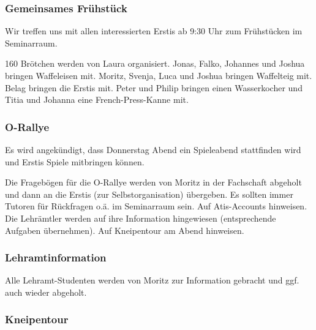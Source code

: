 \documentclass[10pt,twocolumn,ngerman]{scrartcl}
\begin{document}
\subsubsection{Gemeinsames Frühstück}

Wir treffen uns mit allen interessierten Erstis ab 9:30 Uhr zum Frühstücken
im Seminarraum.

160 Brötchen werden von Laura organisiert. Jonas, Falko, Johannes
und Joshua bringen Waffeleisen mit. Moritz, Svenja, Luca und Joshua
bringen Waffelteig mit. Belag bringen die Erstis mit. Peter und Philip
bringen einen Wasserkocher und Titia und Johanna eine French-Press-Kanne
mit.

\subsubsection{O-Rallye}

Es wird angekündigt, dass Donnerstag Abend ein Spieleabend stattfinden
wird und Erstis Spiele mitbringen können.

Die Fragebögen für die O-Rallye werden von Moritz in der Fachschaft
abgeholt und dann an die Erstis (zur Selbstorganisation) übergeben.
Es sollten immer Tutoren für Rückfragen o.ä. im Seminarraum sein.
Auf Atis-Accounts hinweisen. Die Lehrämtler werden auf ihre Information
hingewiesen (entsprechende Aufgaben übernehmen). Auf Kneipentour am
Abend hinweisen.

\subsubsection{Lehramtinformation}

Alle Lehramt-Studenten werden von Moritz zur Information gebracht
und ggf. auch wieder abgeholt.

\subsubsection{Kneipentour}

\end{document}
